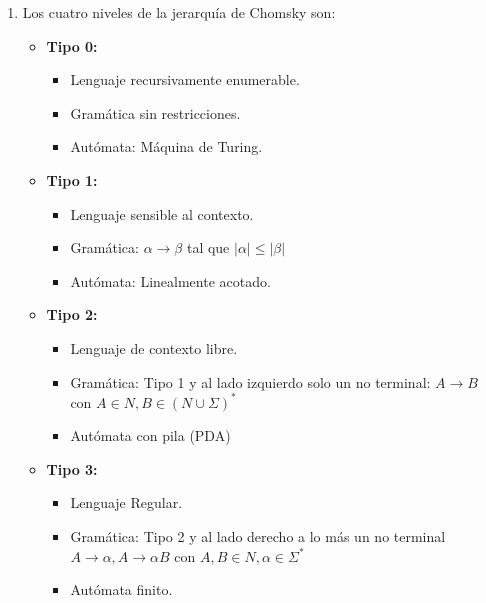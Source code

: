 \documentclass[spanish, fleqn]{article}
\begin{document}
\begin{enumerate}
			\item 
				Los cuatro niveles de la jerarquía de Chomsky son:
				\begin{itemize}
					\item
						\textbf{Tipo 0:}
						\begin{itemize}
							\item 
								Lenguaje recursivamente enumerable.
							\item
								Gramática sin restricciones.
							\item
								Autómata: Máquina de Turing.
						\end{itemize}
					\item
						\textbf{Tipo 1:}
						\begin{itemize}
							\item
								Lenguaje sensible al contexto.
							\item
								Gramática: $\alpha \rightarrow \beta$ tal que
								$|\alpha| \leq |\beta|$
							\item
								Autómata: Linealmente acotado.
						\end{itemize}
					\item
						\textbf{Tipo 2:}
						\begin{itemize}
							\item
								Lenguaje de contexto libre.
							\item
								Gramática: Tipo 1 y al lado izquierdo solo un
								no terminal: $A \rightarrow B$ con $A \in N,
								B \in (N \cup \Sigma)^{*}$
							\item
								Autómata con pila (PDA)
						\end{itemize}
					\item
						\textbf{Tipo 3:}
						\begin{itemize}
							\item
								Lenguaje Regular.
							\item
								Gramática: Tipo 2 y al lado derecho a lo más un
							 	no terminal $A \rightarrow \alpha, 
								A \rightarrow \alpha B$ con $A,B \in N,
								\alpha \in \Sigma^{*}$
							\item
								Autómata finito. 
						\end{itemize}
				\end{itemize}


\end{enumerate}
\end{document}

